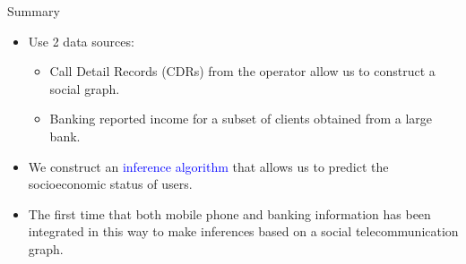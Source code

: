 \documentclass{beamer}
\begin{document}
\begin{frame}{Summary}

\begin{itemize}

\begin{block}{Objective}
Generate inferences of socioeconomic status in the communication graph.
\end{block}
\medskip

\pause

\item Use 2 data sources:
\begin{itemize}
\item Call Detail Records (CDRs) from the operator allow us to construct a social graph.
\item Banking reported income for a subset of clients obtained from a large bank.
\end{itemize} 

\item We construct an \textcolor{blue}{inference algorithm} that allows us to predict the socioeconomic status of users.

\item The first time that both mobile phone and banking information has been integrated in this way to make inferences based on a social telecommunication graph.

\end{itemize}

\end{frame}
\end{document}
